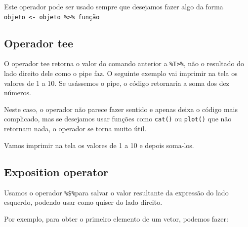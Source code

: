\documentclass[]{book}
\newenvironment{Shaded}{\begin{snugshade}}{\end{snugshade}}
\newcommand{\CommentTok}[1]{\textcolor[rgb]{0.56,0.35,0.01}{\textit{#1}}}
\newcommand{\DecValTok}[1]{\textcolor[rgb]{0.00,0.00,0.81}{#1}}
\newcommand{\KeywordTok}[1]{\textcolor[rgb]{0.13,0.29,0.53}{\textbf{#1}}}
\newcommand{\NormalTok}[1]{#1}
\newcommand{\OperatorTok}[1]{\textcolor[rgb]{0.81,0.36,0.00}{\textbf{#1}}}
\newcommand{\StringTok}[1]{\textcolor[rgb]{0.31,0.60,0.02}{#1}}
\begin{document}
Este operador pode ser usado sempre que desejamos fazer algo da forma \texttt{objeto\ \textless{}-\ objeto\ \%\textgreater{}\%\ função}

\hypertarget{operador-tee}{%
\subsection{Operador tee}\label{operador-tee}}

O operador tee retorna o valor do comando anterior a \texttt{\%T\textgreater{}\%}, não o resultado do lado direito dele como o pipe faz. O seguinte exemplo vai imprimir na tela os valores de 1 a 10. Se usássemos o pipe, o código retornaria a soma dos dez números.

\begin{Shaded}
\end{Shaded}

Neste caso, o operador não parece fazer sentido e apenas deixa o código mais complicado, mas se desejamos usar funções como \texttt{cat()} ou \texttt{plot()} que não retornam nada, o operador se torna muito útil.

Vamos imprimir na tela os valores de 1 a 10 e depois soma-los.

\begin{Shaded}
\end{Shaded}

\hypertarget{exposition-operator}{%
\subsection{Exposition operator}\label{exposition-operator}}

Usamos o operador \texttt{\%\$\%}para salvar o valor resultante da expressão do lado esquerdo, podendo usar como quiser do lado direito.

Por exemplo, para obter o primeiro elemento de um vetor, podemos fazer:
\end{document}
